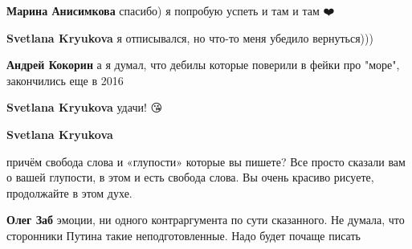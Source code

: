 \begin{itemize}
\begin{itemize}
\textbf{Марина Анисимкова} спасибо) я попробую успеть и там и там ❤️

 
\textbf{Svetlana Kryukova} я отписывался, но что-то меня убедило вернуться)))

 
\textbf{Андрей Кокорин} а я думал, что дебилы которые поверили в фейки про "море", закончились еще в 2016 \Smiley[1.0][yellow]

 
\textbf{Svetlana Kryukova} удачи! 😘

 
\textbf{Svetlana Kryukova} 

причём свобода слова и «глупости» которые вы пишете? Все просто сказали вам о
вашей глупости, в этом и есть свобода слова. Вы очень красиво рисуете,
продолжайте в этом духе.



 
\textbf{Олег Заб} эмоции, ни одного контраргумента по сути сказанного. Не думала, что сторонники Путина такие неподготовленные. Надо будет почаще писать

 


\end{itemize}
\end{itemize}
